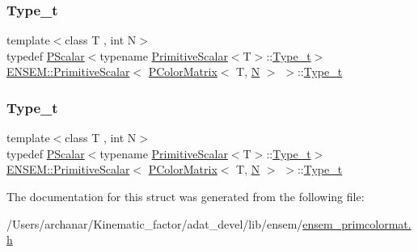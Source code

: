 \subsubsection{\texorpdfstring{Type\_t}{Type\_t}\hspace{0.1cm}{\footnotesize\ttfamily [1/2]}}
{\footnotesize\ttfamily template$<$class T , int N$>$ \\
typedef \mbox{\hyperlink{classENSEM_1_1PScalar}{P\+Scalar}}$<$typename \mbox{\hyperlink{structENSEM_1_1PrimitiveScalar}{Primitive\+Scalar}}$<$T$>$\+::\mbox{\hyperlink{structENSEM_1_1PrimitiveScalar_3_01PColorMatrix_3_01T_00_01N_01_4_01_4_ac43408bdf04ddac58e78326690949cbd}{Type\+\_\+t}}$>$ \mbox{\hyperlink{structENSEM_1_1PrimitiveScalar}{E\+N\+S\+E\+M\+::\+Primitive\+Scalar}}$<$ \mbox{\hyperlink{classENSEM_1_1PColorMatrix}{P\+Color\+Matrix}}$<$ T, \mbox{\hyperlink{operator__name__util_8cc_a7722c8ecbb62d99aee7ce68b1752f337}{N}} $>$ $>$\+::\mbox{\hyperlink{structENSEM_1_1PrimitiveScalar_3_01PColorMatrix_3_01T_00_01N_01_4_01_4_ac43408bdf04ddac58e78326690949cbd}{Type\+\_\+t}}}

\mbox{\label{structENSEM_1_1PrimitiveScalar_3_01PColorMatrix_3_01T_00_01N_01_4_01_4_ac43408bdf04ddac58e78326690949cbd}} 
\subsubsection{\texorpdfstring{Type\_t}{Type\_t}\hspace{0.1cm}{\footnotesize\ttfamily [2/2]}}
{\footnotesize\ttfamily template$<$class T , int N$>$ \\
typedef \mbox{\hyperlink{classENSEM_1_1PScalar}{P\+Scalar}}$<$typename \mbox{\hyperlink{structENSEM_1_1PrimitiveScalar}{Primitive\+Scalar}}$<$T$>$\+::\mbox{\hyperlink{structENSEM_1_1PrimitiveScalar_3_01PColorMatrix_3_01T_00_01N_01_4_01_4_ac43408bdf04ddac58e78326690949cbd}{Type\+\_\+t}}$>$ \mbox{\hyperlink{structENSEM_1_1PrimitiveScalar}{E\+N\+S\+E\+M\+::\+Primitive\+Scalar}}$<$ \mbox{\hyperlink{classENSEM_1_1PColorMatrix}{P\+Color\+Matrix}}$<$ T, \mbox{\hyperlink{operator__name__util_8cc_a7722c8ecbb62d99aee7ce68b1752f337}{N}} $>$ $>$\+::\mbox{\hyperlink{structENSEM_1_1PrimitiveScalar_3_01PColorMatrix_3_01T_00_01N_01_4_01_4_ac43408bdf04ddac58e78326690949cbd}{Type\+\_\+t}}}



The documentation for this struct was generated from the following file\+:\begin{DoxyCompactItemize}
\item 
/\+Users/archanar/\+Kinematic\+\_\+factor/adat\+\_\+devel/lib/ensem/\mbox{\hyperlink{lib_2ensem_2ensem__primcolormat_8h}{ensem\+\_\+primcolormat.\+h}}\end{DoxyCompactItemize}
